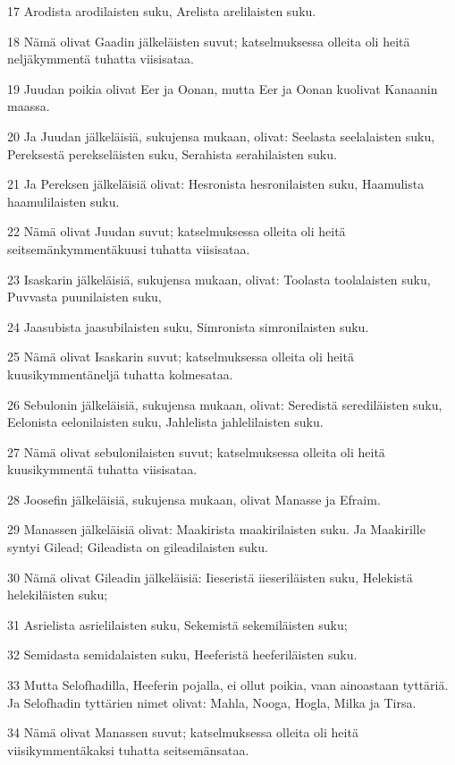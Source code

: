 \par 17 Arodista arodilaisten suku, Arelista arelilaisten suku.
\par 18 Nämä olivat Gaadin jälkeläisten suvut; katselmuksessa olleita oli heitä neljäkymmentä tuhatta viisisataa.
\par 19 Juudan poikia olivat Eer ja Oonan, mutta Eer ja Oonan kuolivat Kanaanin maassa.
\par 20 Ja Juudan jälkeläisiä, sukujensa mukaan, olivat: Seelasta seelalaisten suku, Pereksestä perekseläisten suku, Serahista serahilaisten suku.
\par 21 Ja Pereksen jälkeläisiä olivat: Hesronista hesronilaisten suku, Haamulista haamulilaisten suku.
\par 22 Nämä olivat Juudan suvut; katselmuksessa olleita oli heitä seitsemänkymmentäkuusi tuhatta viisisataa.
\par 23 Isaskarin jälkeläisiä, sukujensa mukaan, olivat: Toolasta toolalaisten suku, Puvvasta puunilaisten suku,
\par 24 Jaasubista jaasubilaisten suku, Simronista simronilaisten suku.
\par 25 Nämä olivat Isaskarin suvut; katselmuksessa olleita oli heitä kuusikymmentäneljä tuhatta kolmesataa.
\par 26 Sebulonin jälkeläisiä, sukujensa mukaan, olivat: Seredistä serediläisten suku, Eelonista eelonilaisten suku, Jahlelista jahlelilaisten suku.
\par 27 Nämä olivat sebulonilaisten suvut; katselmuksessa olleita oli heitä kuusikymmentä tuhatta viisisataa.
\par 28 Joosefin jälkeläisiä, sukujensa mukaan, olivat Manasse ja Efraim.
\par 29 Manassen jälkeläisiä olivat: Maakirista maakirilaisten suku. Ja Maakirille syntyi Gilead; Gileadista on gileadilaisten suku.
\par 30 Nämä olivat Gileadin jälkeläisiä: Iieseristä iieseriläisten suku, Helekistä helekiläisten suku;
\par 31 Asrielista asrielilaisten suku, Sekemistä sekemiläisten suku;
\par 32 Semidasta semidalaisten suku, Heeferistä heeferiläisten suku.
\par 33 Mutta Selofhadilla, Heeferin pojalla, ei ollut poikia, vaan ainoastaan tyttäriä. Ja Selofhadin tyttärien nimet olivat: Mahla, Nooga, Hogla, Milka ja Tirsa.
\par 34 Nämä olivat Manassen suvut; katselmuksessa olleita oli heitä viisikymmentäkaksi tuhatta seitsemänsataa.
